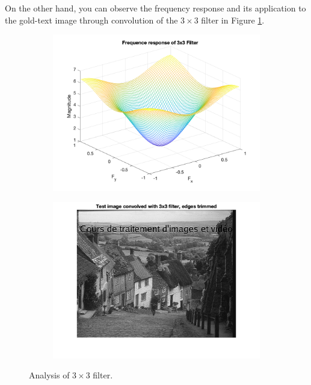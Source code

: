 \documentclass{article}
\begin{document}
On the other hand, you can observe the frequency response and its application to the gold-text image through convolution of the $3 \times 3$ filter in Figure \ref{fig:3x3}.
\begin{figure}
    \centering
    \begin{subfigure}[c]{0.49\textwidth}
        \includegraphics[width=\textwidth]{images/freq_resp_3x3.png}
    \end{subfigure}
    \hfill
    \begin{subfigure}[c]{0.49\textwidth}
        \includegraphics[width=\textwidth]{images/gold_text_filtered2.png}
    \end{subfigure}
    \caption{Analysis of  $3 \times 3$ filter.}
    \label{fig:3x3}
\end{figure}
\end{document}
